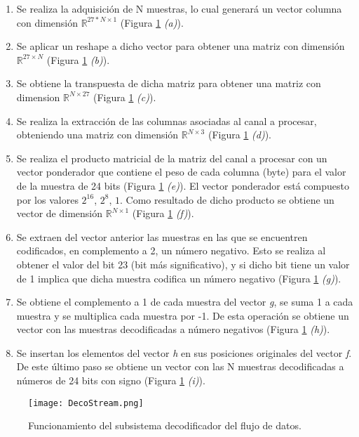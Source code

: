 \begin{enumerate}
	\item Se realiza la adquisición de N muestras, lo cual generará un vector columna con dimensión $\mathbb{R}^{27*N\times 1}$ (Figura \ref{Figura: DecoStream} \emph{(a)}).
	\item Se aplicar un reshape a dicho vector para obtener una matriz con dimensión $\mathbb{R}^{27\times N}$ (Figura \ref{Figura: DecoStream} \emph{(b)}).
	\item Se obtiene la transpuesta de dicha matriz para obtener una matriz con dimension $\mathbb{R}^{N\times 27}$ (Figura \ref{Figura: DecoStream} \emph{(c)}).
	\item Se realiza la extracción de las columnas asociadas al canal a procesar, obteniendo una matriz con dimensión $\mathbb{R}^{N\times 3}$ (Figura \ref{Figura: DecoStream} \emph{(d)}).
	\item Se realiza el producto matricial de la matriz del canal a procesar con un vector ponderador que contiene el peso de cada columna (byte) para el valor de la muestra de 24 bits (Figura \ref{Figura: DecoStream} \emph{(e)}). El vector ponderador está compuesto por los valores $2^{16}$, $2^8$, $1$. Como resultado de dicho producto se obtiene un vector de dimensión $\mathbb{R}^{N\times 1}$ (Figura \ref{Figura: DecoStream} \emph{(f)}).
	\item Se extraen del vector anterior las muestras en las que se encuentren codificados, en complemento a 2, un número negativo. Esto se realiza al obtener el valor del bit 23 (bit más significativo), y si dicho bit tiene un valor de 1 implica que dicha muestra codifica un número negativo (Figura \ref{Figura: DecoStream} \emph{(g)}).
	\item Se obtiene el complemento a 1 de cada muestra del vector \emph{g}, se suma 1 a cada muestra y se multiplica cada muestra por -1. De esta operación se obtiene un vector con las muestras decodificadas a número negativos (Figura \ref{Figura: DecoStream} \emph{(h)}).
	\item Se insertan los elementos del vector \emph{h} en sus posiciones originales del vector \emph{f}. De este último paso se obtiene un vector con las N muestras decodificadas a números de 24 bits con signo (Figura \ref{Figura: DecoStream} \emph{(i)}).
\end{enumerate}

\begin{figure}[htbp]
\centering
	\texttt{[image: DecoStream.png]}
	\caption{Funcionamiento del subsistema decodificador del flujo de datos.}
	\label{Figura: DecoStream}
\end{figure}


